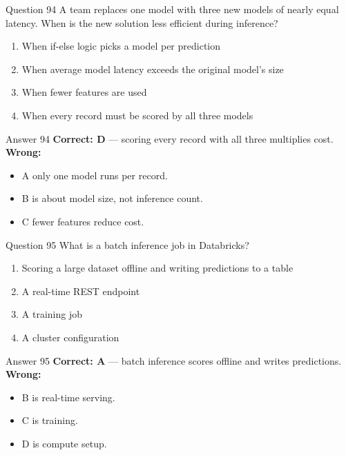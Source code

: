 \documentclass[aspectratio=169,11pt]{beamer}
\begin{document}
	\begin{frame}{Question 94}
		A team replaces one model with three new models of nearly equal latency. When is the new solution less efficient during inference?
		\begin{enumerate}[label=\Alph*.]
			\item When if-else logic picks a model per prediction
			\item When average model latency exceeds the original model's size
			\item When fewer features are used
			\item When every record must be scored by all three models
		\end{enumerate}
	\end{frame}
	\begin{frame}{Answer 94}
		\textbf{Correct: D} --- scoring every record with all three multiplies cost.\\
		\vspace{0.5em}
		\textbf{Wrong:}
		\begin{itemize}
			\item A only one model runs per record.
			\item B is about model size, not inference count.
			\item C fewer features reduce cost.
		\end{itemize}
	\end{frame}
	
	\begin{frame}{Question 95}
		What is a batch inference job in Databricks?
		\begin{enumerate}[label=\Alph*.]
			\item Scoring a large dataset offline and writing predictions to a table
			\item A real-time REST endpoint
			\item A training job
			\item A cluster configuration
		\end{enumerate}
	\end{frame}
	\begin{frame}{Answer 95}
		\textbf{Correct: A} --- batch inference scores offline and writes predictions.\\
		\vspace{0.5em}
		\textbf{Wrong:}
		\begin{itemize}
			\item B is real-time serving.
			\item C is training.
			\item D is compute setup.
		\end{itemize}
	\end{frame}
	
\end{document}
